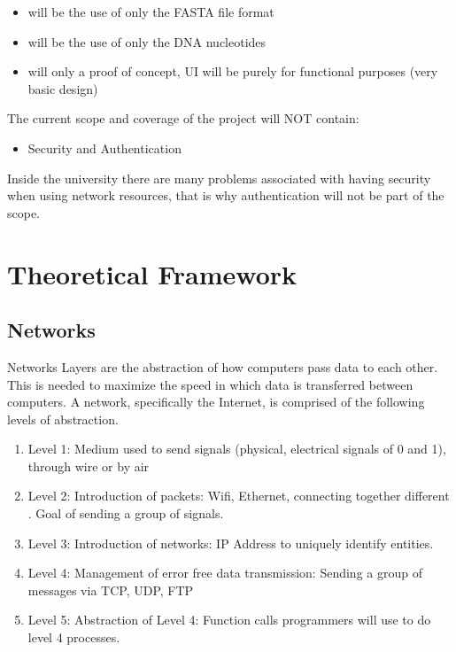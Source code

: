 \documentclass{article}
\begin{document}

\begin{itemize}
    \item will be the use of only the FASTA file format
    \item will be the use of only the DNA nucleotides
    \item will only a proof of concept, UI will be purely for functional purposes
(very basic design)
\end{itemize}

The current scope and coverage of the project will NOT contain:

\begin{itemize}
    \item Security and Authentication
\end{itemize}

Inside the university there are many problems associated with having security when using network resources, that is why authentication will not be part of the scope.

\section{Theoretical Framework}

\subsection{Networks}

Networks Layers are the abstraction of how computers pass data to each other. This is needed to maximize the speed in which data is transferred between computers. A network, specifically the Internet, is comprised of the following levels of abstraction. \autocite{kurose}
\begin{enumerate}
    \item Level 1: Medium used to send signals (physical, electrical signals of 0
and 1), through wire or by air
    \item Level 2: Introduction of packets: Wifi, Ethernet, connecting together
different . Goal of sending a group of signals.
    \item Level 3: Introduction of networks: IP Address to uniquely identify
entities.
    \item Level 4: Management of error free data transmission: Sending a group
of messages via TCP, UDP, FTP
    \item Level 5: Abstraction of Level 4: Function calls programmers will use
to do level 4 processes.
\end{enumerate}
\end{document}
